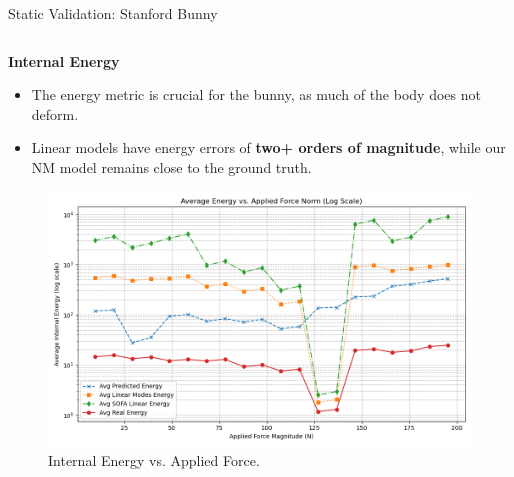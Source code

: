 \documentclass{beamer}
\begin{document}
\begin{frame}{Static Validation: Stanford Bunny}
\begin{columns}[T]
        \begin{column}{0.5\textwidth}
            \textbf{Internal Energy}
            \begin{itemize}
                \item The energy metric is crucial for the bunny, as much of the body does not deform.
                \item Linear models have energy errors of \textbf{two+ orders of magnitude}, while our NM model remains close to the ground truth.
            \end{itemize}
            \begin{figure}
                \includegraphics[width=\textwidth]{Images/bunny_static_energy.png}
                \caption{Internal Energy vs. Applied Force.}
            \end{figure}
        \end{column}
    \end{columns}
\end{frame}
\end{document}
